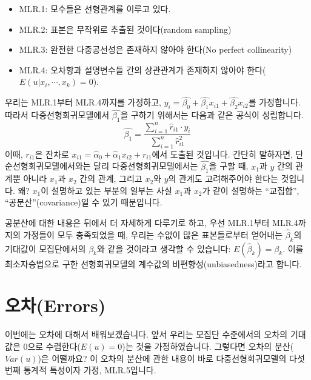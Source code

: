 \documentclass[
]{book}
\begin{document}
\begin{itemize}
\item
  MLR.1: 모수들은 선형관계를 이루고 있다.
\item
  MLR.2: 표본은 무작위로 추출된 것이다(random sampling)
\item
  MLR.3: 완전한 다중공선성은 존재하지 않아야 한다(No perfect collinearity)
\item
  MLR.4: 오차항과 설명변수들 간의 상관관계가 존재하지 않아야 한다(\(E(u|x_i,\cdots,x_k) = 0\)).
\end{itemize}

우리는 MLR.1부터 MLR.4까지를 가정하고, \(y_i = \hat{\beta_0} + \hat{\beta_1}x_{i1} + \hat{\beta_2}x_{i2}\)를 가정합니다. 따라서 다중선형회귀모델에서 \(\hat{\beta_1}\)을 구하기 위해서는 다음과 같은 공식이 성립합니다.
\[\hat{\beta_1} = \frac{\sum^{n}_{i=1}\hat{r}_{i1}\cdot y_i}{\sum^{n}_{i=1}\hat{r}^2_{i1}}\]
이때, \(r_{i1}\)은 잔차로 \(x_{i1} = \hat{\alpha}_0 + \hat{\alpha}_1x_{i2} + r_{i1}\)에서 도출된 것입니다. 간단히 말하자면, 단순선형회귀모델에서와는 달리 다중선형회귀모델에서는 \(\hat{\beta_1}\)을 구할 때, \(x_1\)과 \(y\) 간의 관계뿐 아니라 \(x_1\)과 \(x_2\) 간의 관계, 그리고 \(x_2\)와 \(y\)의 관계도 고려해주어야 한다는 것입니다. 왜? \(x_1\)이 설명하고 있는 부분의 일부는 사실 \(x_1\)과 \(x_2\)가 같이 설명하는 ``교집합'', ``공분산''(covariance)일 수 있기 때문입니다.

공분산에 대한 내용은 뒤에서 더 자세하게 다루기로 하고, 우선 MLR.1부터 MLR.4까지의 가정들이 모두 충족되었을 때, 우리는 수없이 많은 표본들로부터 얻어내는 \(\hat{\beta}_k\)의 기대값이 모집단에서의 \(\beta_k\)와 같을 것이라고 생각할 수 있습니다: \(E(\hat{\beta}_k) = \beta_k\). 이를 최소자승법으로 구한 선형회귀모델의 계수값의 비편향성(unbiasedness)라고 합니다.

\hypertarget{uxc624uxcc28errors}{%
\section{오차(Errors)}\label{uxc624uxcc28errors}}

이번에는 오차에 대해서 배워보겠습니다. 앞서 우리는 모집단 수준에서의 오차의 기대값은 0으로 수렴한다(\(E(u) = 0\))는 것을 가정하였습니다. 그렇다면 오차의 분산(\(Var(u)\))은 어떨까요? 이 오차의 분산에 관한 내용이 바로 다중선형회귀모델의 다섯번째 통계적 특성이자 가정, MLR.5입니다.
\end{document}
